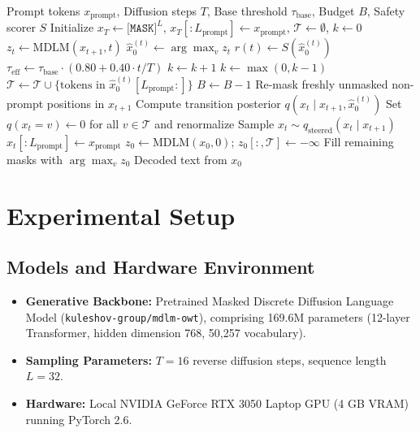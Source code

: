 \documentclass[conference]{IEEEtran}
\begin{document}
\begin{algorithm}[t]
\caption{Guard-Trajectory Sampling with Directional Taboo Steering}
\label{alg:guard}
\begin{algorithmic}[1]
\REQUIRE Prompt tokens $x_{\text{prompt}}$, Diffusion steps $T$, Base threshold $\tau_{\text{base}}$, Budget $B$, Safety scorer $S$
\STATE Initialize $x_T \leftarrow \texttt{[MASK]}^L$, $x_T[:L_{\text{prompt}}] \leftarrow x_{\text{prompt}}$, $\mathcal{T} \leftarrow \emptyset$, $k \leftarrow 0$
    \STATE $z_t \leftarrow \text{MDLM}(x_{t+1}, t)$
    \STATE $\hat{x}_0^{(t)} \leftarrow \arg\max_v z_t$
        \STATE $r(t) \leftarrow S(\hat{x}_0^{(t)})$
        \STATE $\tau_{\text{eff}} \leftarrow \tau_{\text{base}} \cdot (0.80 + 0.40 \cdot t/T)$
            \STATE $k \leftarrow k + 1$
        \ELSE
            \STATE $k \leftarrow \max(0, k - 1)$
        \ENDIF
            \STATE $\mathcal{T} \leftarrow \mathcal{T} \cup \{ \text{tokens in } \hat{x}_0^{(t)}[L_{\text{prompt}}:] \}$
            \STATE $B \leftarrow B - 1$
            \STATE Re-mask freshly unmasked non-prompt positions in $x_{t+1}$
        \ENDIF
    \ENDIF
    \STATE Compute transition posterior $q(x_t \mid x_{t+1}, \hat{x}_0^{(t)})$
    \STATE Set $q(x_t = v) \leftarrow 0$ for all $v \in \mathcal{T}$ and renormalize
    \STATE Sample $x_t \sim q_{\text{steered}}(x_t \mid x_{t+1})$
    \STATE $x_t[:L_{\text{prompt}}] \leftarrow x_{\text{prompt}}$
\ENDFOR
{}
    \STATE $z_0 \leftarrow \text{MDLM}(x_0, 0)$; $z_0[:, \mathcal{T}] \leftarrow -\infty$
    \STATE Fill remaining masks with $\arg\max_v z_0$
\ENDIF
\RETURN Decoded text from $x_0$
\end{algorithmic}
\end{algorithm}

\section{Experimental Setup}

\subsection{Models and Hardware Environment}
\begin{itemize}
    \item \textbf{Generative Backbone:} Pretrained Masked Discrete Diffusion Language Model (\texttt{kuleshov-group/mdlm-owt}), comprising 169.6M parameters (12-layer Transformer, hidden dimension 768, 50,257 vocabulary).
    \item \textbf{Sampling Parameters:} $T = 16$ reverse diffusion steps, sequence length $L = 32$.
    \item \textbf{Hardware:} Local NVIDIA GeForce RTX 3050 Laptop GPU (4 GB VRAM) running PyTorch 2.6.
\end{itemize}
\end{document}
